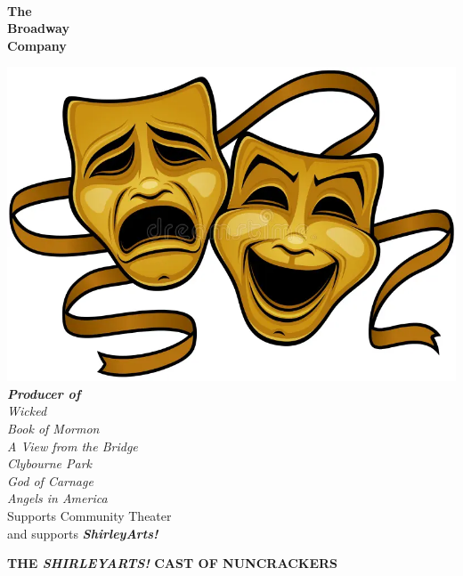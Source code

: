 \documentclass[12pt, a5paper, oneside]{article}
\begin{document}
\begin{minipage}[c][\textheight]{\linewidth}
\begin{framed}
\begin{center}
\begin{minipage}{0.25\linewidth}
\end{minipage}\\
\Large{\selectfont \textbf{The\\ Broadway\\ Company}}

\hfill\newline
\hspace*{11mm}\includegraphics[scale=0.2]{media/theaterLogo.png}
\hfill\newline
{}\selectfont
\large{\textbf{\emph{Producer of}}}\\
\hfill\newline
\normalsize\emph{Wicked\\
Book of Mormon\\
A View from the Bridge\\
Clybourne Park\\
God of Carnage\\
Angels in America\\
}
\selectfont
\hfill\newline
Supports Community Theater \\
and supports \emph{\textbf{ShirleyArts!}}
\end{center}
\end{framed}
\end{minipage}

\begin{center}
\Large \textbf{THE \emph{SHIRLEYARTS!} CAST OF NUNCRACKERS}
\end{center}
\end{document}
